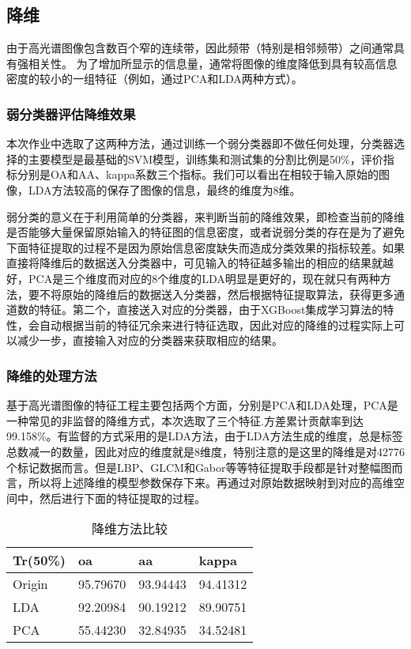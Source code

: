 \documentclass[runningheads]{llncs}
\begin{document}
\subsection{降维}
由于高光谱图像包含数百个窄的连续带，因此频带（特别是相邻频带）之间通常具有强相关性。 为了增加所显示的信息量，通常将图像的维度降低到具有较高信息密度的较小的一组特征（例如，通过PCA和LDA两种方式）。
\subsubsection{弱分类器评估降维效果}
本次作业中选取了这两种方法，通过训练一个弱分类器即不做任何处理，分类器选择的主要模型是最基础的SVM模型，训练集和测试集的分割比例是50\%，评价指标分别是OA和AA、kappa系数三个指标。我们可以看出在相较于输入原始的图像，LDA方法较高的保存了图像的信息，最终的维度为8维。


弱分类的意义在于利用简单的分类器，来判断当前的降维效果，即检查当前的降维是否能够大量保留原始输入的特征图的信息密度，或者说弱分类的存在是为了避免下面特征提取的过程不是因为原始信息密度缺失而造成分类效果的指标较差。如果直接将降维后的数据送入分类器中，可见输入的特征越多输出的相应的结果就越好，PCA是三个维度而对应的8个维度的LDA明显是更好的，现在就只有两种方法，要不将原始的降维后的数据送入分类器，然后根据特征提取算法，获得更多通道数的特征。第二个，直接送入对应的分类器，由于XGBoost集成学习算法的特性，会自动根据当前的特征冗余来进行特征选取，因此对应的降维的过程实际上可以减少一步，直接输入对应的分类器来获取相应的结果。\\

\subsubsection{降维的处理方法}
基于高光谱图像的特征工程主要包括两个方面，分别是PCA和LDA处理，PCA是一种常见的非监督的降维方式，本次选取了三个特征.方差累计贡献率到达99.158\%。有监督的方式采用的是LDA方法，由于LDA方法生成的维度，总是标签总数减一的数量，因此对应的维度就是8维度，特别注意的是这里的降维是对42776个标记数据而言。但是LBP、GLCM和Gabor等等特征提取手段都是针对整幅图而言，所以将上述降维的模型参数保存下来。再通过对原始数据映射到对应的高维空间中，然后进行下面的特征提取的过程。
\begin{table}[]
\caption{降维方法比较}
\centering
\setlength\tabcolsep{25pt}
\label{tab:my-table}
\begin{tabular}{llll}
\toprule
Tr(50\%) & oa       & aa       & kappa    \\

\midrule
Origin  & 95.79670 & 93.94443 & 94.41312 \\
LDA     & 92.20984 & 90.19212 & 89.90751 \\
PCA     & 55.44230 & 32.84935 & 34.52481\\
\bottomrule
\end{tabular}
\end{table}
\end{document}
